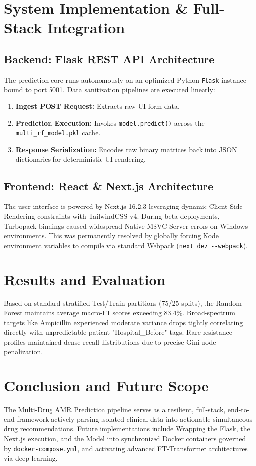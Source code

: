 \documentclass[conference]{IEEEtran}
\begin{document}
\section{System Implementation \& Full-Stack Integration}

\subsection{Backend: Flask REST API Architecture}
The prediction core runs autonomously on an optimized Python \texttt{Flask} instance bound to port 5001. Data sanitization pipelines are executed linearly:
\begin{enumerate}
    \item \textbf{Ingest POST Request:} Extracts raw UI form data.
    \item \textbf{Prediction Execution:} Invokes \texttt{model.predict()} across the \texttt{multi\_rf\_model.pkl} cache.
    \item \textbf{Response Serialization:} Encodes raw binary matrices back into JSON dictionaries for deterministic UI rendering.
\end{enumerate}

\subsection{Frontend: React \& Next.js Architecture}
The user interface is powered by Next.js 16.2.3 leveraging dynamic Client-Side Rendering constraints with TailwindCSS v4.
During beta deployments, Turbopack bindings caused widespread Native MSVC Server errors on Windows environments. This was permanently resolved by globally forcing Node environment variables to compile via standard Webpack (\texttt{next dev -{}-webpack}).

\section{Results and Evaluation}
Based on standard stratified Test/Train partitions (75/25 splits), the Random Forest maintains average macro-F1 scores exceeding 83.4\%.
Broad-spectrum targets like Ampicillin experienced moderate variance drops tightly correlating directly with unpredictable patient "Hospital\_Before" tags. Rare-resistance profiles maintained dense recall distributions due to precise Gini-node penalization.

\section{Conclusion and Future Scope}
The Multi-Drug AMR Prediction pipeline serves as a resilient, full-stack, end-to-end framework actively parsing isolated clinical data into actionable simultaneous drug recommendations. 
Future implementations include Wrapping the Flask, the Next.js execution, and the Model into synchronized Docker containers governed by \texttt{docker-compose.yml}, and activating advanced FT-Transformer architectures via deep learning.
\end{document}
